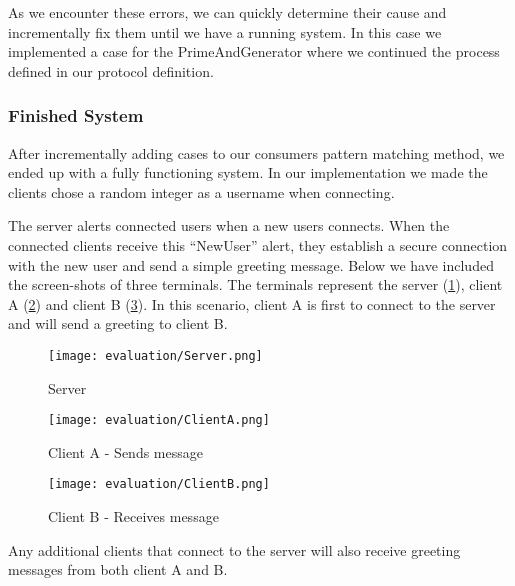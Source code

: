 As we encounter these errors, we can quickly determine their cause and incrementally fix them until we have a running system. In this case we implemented a case for the PrimeAndGenerator where we continued the process defined in our protocol definition.

\subsubsection{Finished System}
After incrementally adding cases to our consumers pattern matching method, we ended up with a fully functioning system. In our implementation we made the clients chose a random integer as a username when connecting. 

The server alerts connected users when a new users connects. When the connected clients receive this ``NewUser'' alert, they establish a secure connection with the new user and send a simple greeting message. Below we have included the screen-shots of three terminals. The terminals represent the server (\ref{fig:server}), client A (\ref{fig:clienta}) and client B (\ref{fig:clientb}). In this scenario, client A is first to connect to the server and will send a greeting to client B.

\begin{figure}[H]
  \centering
  \texttt{[image: evaluation/Server.png]}
  \caption{Server}
  \label{fig:server}
\end{figure}

\begin{figure}[H]
  \centering
  \texttt{[image: evaluation/ClientA.png]}
  \caption{Client A - Sends message}
  \label{fig:clienta}
\end{figure}

\begin{figure}[H]
  \centering
  \texttt{[image: evaluation/ClientB.png]}
  \caption{Client B - Receives message}
  \label{fig:clientb}
\end{figure}

Any additional clients that connect to the server will also receive greeting messages from both client A and B.




